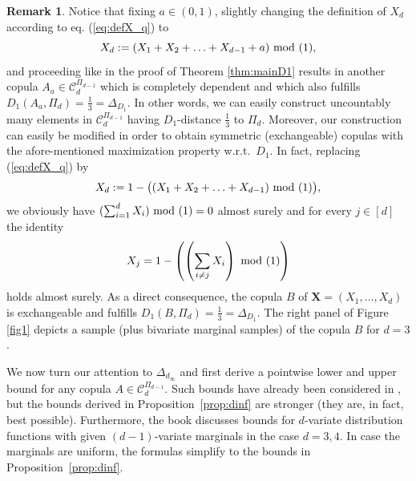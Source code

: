 \documentclass[12pt,a4paper]{amsart}
\theoremstyle{definition}
\newtheorem{remark}[theorem]{Remark}
\newcommand{\kc}{\mathcal{C}}
\begin{document}
\begin{remark}\label{rem:symm}
    Notice that fixing $a \in (0,1)$, slightly changing the definition 
    of $X_d$ according to eq. (\ref{eq:defX_q}) to 
    \begin{equation*}
        X_d:= (X_1 + X_2 + \ldots + X_{d-1} + a)  \,\, \textup{mod (1)}, 
    \end{equation*}
    and proceeding like in the proof of Theorem \ref{thm:mainD1}
    results in another copula $A_a \in \kc_d^{\Pi_{d-1}}$ 
    which is completely dependent and which also fulfills 
    $D_1(A_a,\Pi_d)=\frac{1}{3}=\Delta_{D_1}$. 
    In other words, we can easily construct uncountably many elements in 
    $\kc_d^{\Pi_{d-1}}$ having $D_1$-distance $\frac{1}{3}$ to $\Pi_d$.
    Moreover, our construction can easily be modified in order to obtain symmetric 
    (exchangeable) copulas with the afore-mentioned maximization property
    w.r.t.~$D_1$. 
    In fact, replacing (\ref{eq:defX_q}) by 
    \begin{equation*}
        X_d:= 1 - \big((X_1 + X_2 + \ldots + X_{d-1})  \,\, \textup{mod (1)}\big), 
    \end{equation*}
    we obviously have $(\sum_{i=1}^d X_i) \,\,\textup{mod (1)} =0$ almost surely and for every 
    $j \in [d]$ the identity 
    $$
     X_j = 1 - \left(\left(\sum_{i\neq j} X_i\right)  \,\, \textup{mod (1)}\right)
    $$
    holds almost surely. As a direct consequence, the copula $B$ of $\mathbf{X}=(X_1,\ldots,X_d)$ is
    exchangeable and fulfills $D_1(B,\Pi_d)=\frac{1}{3}=\Delta_{D_1}$. 
    The right panel of Figure \ref{fig1} depicts a sample (plus bivariate marginal samples) 
    of the copula $B$ for $d=3$.
\end{remark}

We now turn our attention to $\Delta_{d_\infty}$ and first derive a pointwise lower and upper bound for any copula $A \in \kc_d^{\Pi_{d-1}}$. Such bounds have already been considered in \cite{Deh83}, but the bounds derived 
in Proposition~\ref{prop:dinf} are stronger (they are, in fact, best possible). 
Furthermore, the book \cite{Joe97} discusses bounds for $d$-variate distribution functions with given $(d-1)$-variate marginals in the case $d=3,4$. In case the marginals are uniform, the formulas simplify to the bounds in Proposition~\ref{prop:dinf}.
\end{document}
